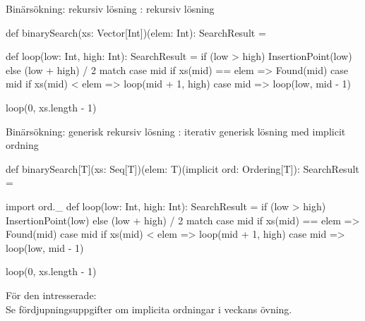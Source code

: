 \begin{Slide}{Binärsökning: rekursiv lösning}
: rekursiv lösning
\begin{Code}
def binarySearch(xs: Vector[Int])(elem: Int): SearchResult = {
  def loop(low: Int, high: Int): SearchResult =
    if (low > high) InsertionPoint(low)
    else (low + high) / 2 match {
      case mid if xs(mid) == elem => Found(mid)
      case mid if xs(mid) < elem  => loop(mid + 1, high)
      case mid                    => loop(low, mid - 1)
    }

  loop(0, xs.length - 1)
}
\end{Code}
\end{Slide}


\begin{Slide}{Binärsökning: generisk rekursiv lösning}
: iterativ generisk lösning med implicit ordning
\begin{CodeSmall}
def binarySearch[T](xs: Seq[T])(elem: T)(implicit ord: Ordering[T]): SearchResult = {
  import ord._
  def loop(low: Int, high: Int): SearchResult =
    if (low > high) InsertionPoint(low)
    else (low + high) / 2 match {
      case mid if xs(mid) == elem => Found(mid)
      case mid if xs(mid) < elem  => loop(mid + 1, high)
      case mid                    => loop(low, mid - 1)
    }

  loop(0, xs.length - 1)
}
\end{CodeSmall}
{\SlideFontSmall För den intresserade:\\Se fördjupningsuppgifter om implicita ordningar i veckans övning.}
\end{Slide}

